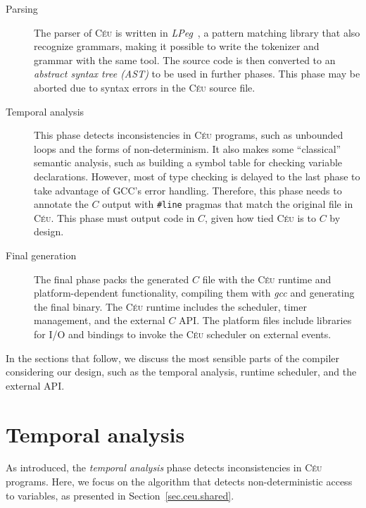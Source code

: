 \documentclass{sigplanconf}
\newcommand{\CEU}{\textsc{C\'{e}u}\xspace}
\newcommand{\code}[1] {{\small{\texttt{#1}}}}
\newcommand{\1}{\;}
\newcommand{\2}{\;\;}
\newcommand{\3}{\;\;\;}
\newcommand{\5}{\;\;\;\;\;}
\begin{document}
\begin{description}

\item[Parsing]

The parser of \CEU is written in \emph{LPeg}~\cite{lua.lpeg}, a pattern 
matching library that also recognize grammars, making it possible to write the 
tokenizer and grammar with the same tool.
%
The source code is then converted to an \emph{abstract syntax tree (AST)} to be 
used in further phases.
%
This phase may be aborted due to syntax errors in the \CEU source file.

\item[Temporal analysis]

This phase detects inconsistencies in \CEU programs, such as unbounded loops 
and the forms of non-determinism.
%
It also makes some ``classical'' semantic analysis, such as building a symbol 
table for checking variable declarations.
However, most of type checking is delayed to the last phase to take advantage 
of GCC's error handling.
Therefore, this phase needs to annotate the $C$ output with \code{\#line} 
pragmas that match the original file in \CEU.
%
This phase must output code in $C$, given how tied \CEU is to $C$ by design.

\item[Final generation]

The final phase packs the generated $C$ file with the \CEU runtime and 
platform-dependent functionality, compiling them with \emph{gcc} and generating 
the final binary.
%
The \CEU runtime includes the scheduler, timer management, and the external $C$ 
API.
%
The platform files include libraries for I/O and bindings to invoke the \CEU 
scheduler on external events.

\end{description}

In the sections that follow, we discuss the most sensible parts of the compiler 
considering our design, such as the temporal analysis, runtime scheduler, and 
the external API.

\section{Temporal analysis}

As introduced, the \emph{temporal analysis} phase detects inconsistencies in 
\CEU programs.
Here, we focus on the algorithm that detects non-deterministic access to 
variables, as presented in Section~\ref{sec.ceu.shared}.
\end{document}
